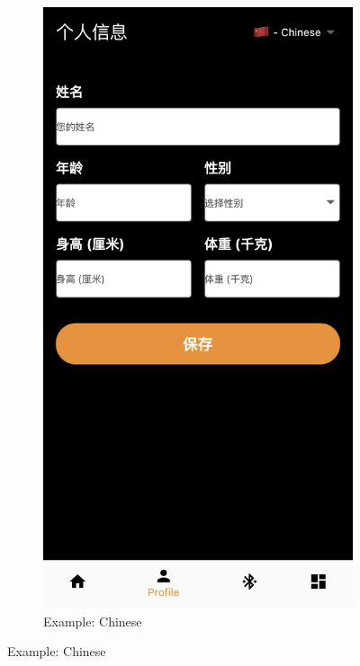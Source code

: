 \documentclass[a4paper]{scrreprt}
\begin{document}
\begin{figure}[htbp]
\begin{subfigure}{0.45\textwidth}
    \end{subfigure}
    \begin{subfigure}{0.45\textwidth}
        \centering
        \includegraphics[scale=0.15]{languages_chinese.jpeg}
        \caption{Example: Chinese}
        \label{fig:graph2}
    \end{subfigure}
    \label{fig:finddev}
\end{figure}
\clearpage
\end{document}
